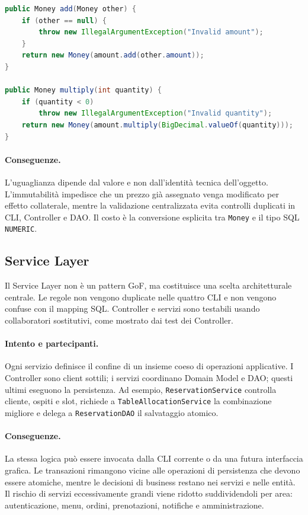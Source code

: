 \documentclass[12pt,a4paper]{article}
\newcommand{\code}[1]{\nolinkurl{#1}}
\begin{document}
\begin{lstlisting}[style=codeStyle,language=Java,
caption={Operazioni immutabili del Value Object Money.}]
public Money add(Money other) {
    if (other == null) {
        throw new IllegalArgumentException("Invalid amount");
    }
    return new Money(amount.add(other.amount));
}

public Money multiply(int quantity) {
    if (quantity < 0)
        throw new IllegalArgumentException("Invalid quantity");
    return new Money(amount.multiply(BigDecimal.valueOf(quantity)));
}
\end{lstlisting}

\paragraph{Conseguenze.}
L'uguaglianza dipende dal valore e non dall'identità tecnica dell'oggetto.
L'immutabilità impedisce che un prezzo già assegnato venga modificato per
effetto collaterale, mentre la validazione centralizzata evita controlli
duplicati in CLI, Controller e DAO. Il costo è la conversione esplicita tra
\code{Money} e il tipo SQL \code{NUMERIC}.

\subsection{Service Layer}

Il Service Layer non è un pattern GoF, ma costituisce una scelta architetturale
centrale. Le regole non vengono duplicate nelle quattro CLI e non vengono
confuse con il mapping SQL. Controller e servizi sono testabili usando
collaboratori sostitutivi, come mostrato dai test dei Controller.

\paragraph{Intento e partecipanti.}
Ogni servizio definisce il confine di un insieme coeso di operazioni
applicative. I Controller sono client sottili; i servizi coordinano Domain Model
e DAO; questi ultimi eseguono la persistenza. Ad esempio,
\code{ReservationService} controlla cliente, ospiti e slot, richiede a
\code{TableAllocationService} la combinazione migliore e delega a
\code{ReservationDAO} il salvataggio atomico.

\paragraph{Conseguenze.}
La stessa logica può essere invocata dalla CLI corrente o da una futura
interfaccia grafica. Le transazioni rimangono vicine alle operazioni di
persistenza che devono essere atomiche, mentre le decisioni di business restano
nei servizi e nelle entità. Il rischio di servizi eccessivamente grandi viene
ridotto suddividendoli per area: autenticazione, menu, ordini, prenotazioni,
notifiche e amministrazione.
\end{document}
